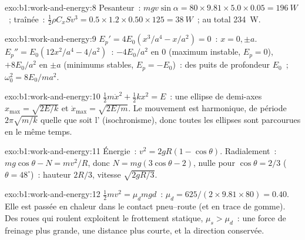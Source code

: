 \begin{solution}{exo:b1:work-and-energy:8}
Pesanteur~: $mgv\sin\alpha = 80 \times 9.81 \times 5.0 \times 0.05 = \qty{196}{W}$~;
traînée~: $\tfrac12\rho C_xSv^3 = 0.5 \times 1.2 \times 0.50 \times 125 =
\qty{38}{W}$~; au total \qty{234}{W}.
\end{solution}

\begin{solution}{exo:b1:work-and-energy:9}
$E_p' = 4E_0(x^3/a^4 - x/a^2) = 0$~: $x = 0, \pm a$. $E_p'' = E_0(12x^2/a^4 -
4/a^2)$~: $-4E_0/a^2$ en $0$ (maximum instable, $E_p = 0$), $+8E_0/a^2$
en $\pm a$ (minimums stables, $E_p = -E_0$)~: des puits de profondeur $E_0$~;
$\omega_0^2 = 8E_0/ma^2$.
\end{solution}

\begin{solution}{exo:b1:work-and-energy:10}
$\tfrac12 m\dot x^2 + \tfrac12 kx^2 = E$~: une ellipse de demi-axes $x_{\max}
= \sqrt{2E/k}$ et $\dot x_{\max} = \sqrt{2E/m}$. Le mouvement est
harmonique, de période $2\pi\sqrt{m/k}$ quelle que soit l'
(isochronisme), donc toutes les ellipses sont parcourues en le même temps.
\end{solution}

\begin{solution}{exo:b1:work-and-energy:11}
Énergie~: $v^2 = 2gR(1 - \cos\theta)$. Radialement~: $mg\cos\theta - N = mv^2/R$,
donc $N = mg(3\cos\theta - 2)$, nulle pour $\cos\theta = 2/3$ ($\theta =
48^\circ$)~: hauteur $2R/3$, vitesse $\sqrt{2gR/3}$.
\end{solution}

\begin{solution}{exo:b1:work-and-energy:12}
$\tfrac12 mv^2 = \mu_dmgd$~: $\mu_d = 625/(2 \times 9.81 \times 80) = 0.40$.
Elle est passée en chaleur dans le contact pneu--route (et en trace de
gomme). Des roues qui roulent exploitent le frottement statique,
$\mu_s > \mu_d$~: une force de freinage plus grande, une distance plus
courte, et la direction conservée.
\end{solution}

